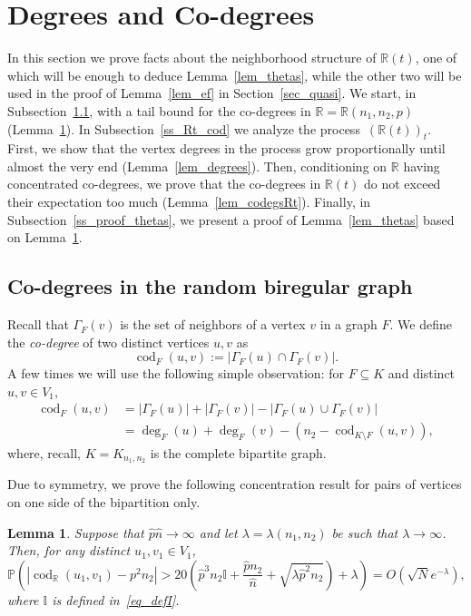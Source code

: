 \documentclass[12pt,reqno]{amsart}
\newcommand{\Prob} {\mathbb {P}}
\newcommand{\prob}[1]{\Prob\left(#1\right)}
\newcommand{\R} {\mathbb R}
\newcommand{\Rnnp}{\R(n_1,n_2,p)}
\newcommand{\Knn} {K_{n_1,n_2}}
\newcommand{\I} {\mathbb I}
\newcommand{\cod}{\operatorname{cod}}
\newtheorem{lemma}[theorem]{Lemma}
\theoremstyle{definition}
\begin{document}
\section{Degrees and Co-degrees}
\label{sec_degs_codegs}
In this section we prove facts about the neighborhood structure of $\R(t)$, one of which will be enough to deduce Lemma~\ref{lem_thetas}, while the other two will be used in the proof of Lemma~\ref{lem_ef} in Section~\ref{sec_quasi}. We start, in Subsection~\ref{ss_codegs}, with  a tail bound for the co-degrees in $\R = \Rnnp$ (Lemma~\ref{lem_codegs}). In Subsection~\ref{ss_Rt_cod} we analyze the process~$(\R(t))_t$. First, we show that the vertex degrees in the process grow proportionally until almost the very end (Lemma~\ref{lem_degrees}). Then, conditioning on $\R$ having concentrated co-degrees, we  prove that the co-degrees in $\R(t)$ do not exceed  their expectation too much (Lemma~\ref{lem_codegsRt}).
Finally, in Subsection~\ref{ss_proof_thetas}, we present a proof of Lemma~\ref{lem_thetas} based on Lemma~\ref{lem_codegs}.


 \subsection{Co-degrees in the random biregular graph}
 \label{ss_codegs}
 Recall that $\Gamma_F(v)$ is the set of neighbors of a vertex $v$ in a graph $F$. We define the \emph{co-degree} of two distinct vertices $u, v$ as
\begin{equation}
\label{eq_def_cod}
 \cod_F(u,v) := |\Gamma_F(u) \cap \Gamma_F(v)|.
\end{equation}
A few times we will use the following simple observation: for $F \subseteq K$ and distinct $u,v\in V_1$,
\begin{equation}
    \label{eq_coco}
  \begin{split}
    \cod_{F}(u, v) &= |\Gamma_{F}(u)| + |\Gamma_{F}(v)| - |\Gamma_{F}(u) \cup \Gamma_{F}(v)| \\
    &= \deg_F(u) + \deg_F(v) - \left( n_2 - \cod_{K \setminus F}(u,v) \right),
  \end{split}
\end{equation}
where, recall, $K = \Knn$ is the complete bipartite graph.
\smallskip

Due to symmetry, we prove the following concentration result for pairs of vertices on one side of the bipartition only.

\begin{lemma}
  \label{lem_codegs}
	Suppose that $\hat p\hat n  \to \infty$  and let $\lambda = \lambda(n_1,n_2)$ be such that $\lambda \to \infty$.
	Then, for any distinct $u_1, v_1 \in V_1$,
\begin{equation*}
  \prob{
	|\cod_{\R}(u_1,v_1) - p^2n_{2}| > 20\left( \hat p^3n_{2}\I + \frac{\hat pn_{2}}{\hat n} + \sqrt{\lambda \hat p^2 n_2} \right) + \lambda
      } = O\left( \sqrt N e^{ - \lambda } \right),
\end{equation*}
where $\I$ is defined in~\eqref{eq_defI}.
\end{lemma}
\end{document}
